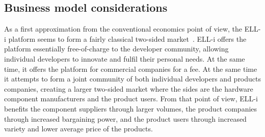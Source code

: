 \documentclass{siamltex}
\begin{document}
%
%
%
%
\subsection{Business model considerations}

As a first approximation from the conventional economics point of
view, the ELL-i platform seems to form a fairly classical two-sided
market~\cite{rochet2003platform}.  ELL-i offers the platform
essentially free-of-charge to the developer community, allowing
individual developers to innovate and fulfil their personal needs.  At
the same time, it offers the platform for commercial companies for a
fee.  At the same time it attempts to form a joint community
of both individual developers and products companies, creating a
larger two-sided market where the sides are the hardware component
manufacturers and the product users.  From that point of view, ELL-i
benefits the component suppliers through larger volumes, the product
companies through increased bargaining power, and the product users
through increased variety and lower average price of the products.  
\end{document}
